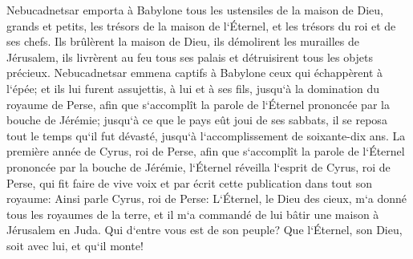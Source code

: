\verse Nebucadnetsar emporta à Babylone tous les ustensiles de la maison de Dieu, grands et petits, les trésors de la maison de l`Éternel, et les trésors du roi et de ses chefs. 
\verse Ils brûlèrent la maison de Dieu, ils démolirent les murailles de Jérusalem, ils livrèrent au feu tous ses palais et détruisirent tous les objets précieux. 
\verse Nebucadnetsar emmena captifs à Babylone ceux qui échappèrent à l`épée; et ils lui furent assujettis, à lui et à ses fils, jusqu`à la domination du royaume de Perse, 
\verse afin que s`accomplît la parole de l`Éternel prononcée par la bouche de Jérémie; jusqu`à ce que le pays eût joui de ses sabbats, il se reposa tout le temps qu`il fut dévasté, jusqu`à l`accomplissement de soixante-dix ans. 
\verse La première année de Cyrus, roi de Perse, afin que s`accomplît la parole de l`Éternel prononcée par la bouche de Jérémie, l`Éternel réveilla l`esprit de Cyrus, roi de Perse, qui fit faire de vive voix et par écrit cette publication dans tout son royaume: 
\verse Ainsi parle Cyrus, roi de Perse: L`Éternel, le Dieu des cieux, m`a donné tous les royaumes de la terre, et il m`a commandé de lui bâtir une maison à Jérusalem en Juda. Qui d`entre vous est de son peuple? Que l`Éternel, son Dieu, soit avec lui, et qu`il monte! 
